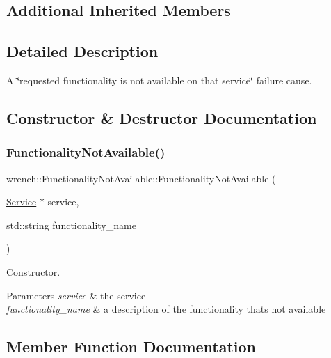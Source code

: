 \subsection*{Additional Inherited Members}


\subsection{Detailed Description}
A \char`\"{}requested functionality is not available on that service\char`\"{} failure cause. 

\subsection{Constructor \& Destructor Documentation}
\mbox{\label{classwrench_1_1_functionality_not_available_a671895dd6d4ceef68e0311b47935b849}} 
\subsubsection{\texorpdfstring{Functionality\+Not\+Available()}{FunctionalityNotAvailable()}}
{\footnotesize\ttfamily wrench\+::\+Functionality\+Not\+Available\+::\+Functionality\+Not\+Available (\begin{DoxyParamCaption}\item[{\hyperlink{classwrench_1_1_service}{Service} $\ast$}]{service,  }\item[{std\+::string}]{functionality\+\_\+name }\end{DoxyParamCaption})}



Constructor. 


\begin{DoxyParams}{Parameters}
{\em service} & the service \\
\hline
{\em functionality\+\_\+name} & a description of the functionality that\textquotesingle{}s not available \\
\hline
\end{DoxyParams}


\subsection{Member Function Documentation}
\mbox{\label{classwrench_1_1_functionality_not_available_ab08a243a126daa6dfc538a7429f656b0}} 
